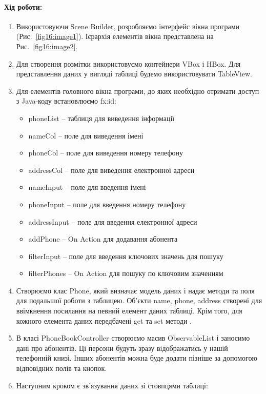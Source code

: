 \paragraph{Хід роботи:}
\begin{enumerate}
	
	\item Використовуючи Scene Builder, розробляємо інтерфейс вікна програми (Рис.~\ref{fig16:image1}). Ієрархія елементів вікна представлена на Рис.~\ref{fig16:image2}.
	\item Для створення розмітки використовуємо контейнери VBox і HBox. Для представлення даних у вигляді таблиці будемо використовувати TableView.
	\item Для елементів головного вікна програми, до яких необхідно отримати доступ з Java-коду встановлюємо fx:id:
	\begin{itemize}
		\item phoneList – таблиця для виведення інформації
		\item nameCol – поле для виведення імені
		\item phoneCol – поле для виведення номеру телефону
		\item addressCol – поле для виведення електронної адреси
		\item nameInput – поле для введення імені
		\item phoneInput – поле для введення номеру телефону
		\item addressInput – поле для введення електронної адреси
		\item addPhone – On Action для додавання абонента
		\item filterInput – поле для введення ключових значень для пошуку
		\item filterPhones – On Action для пошуку по ключовим значенням
	\end{itemize}
	\item Створюємо клас Phone, який визначає модель даних і надає методи та поля для подальшої роботи з таблицею.
		Об’єкти name, phone, address створені для ввімкнення посилання на певний елемент даних таблиці. Крім того, для кожного елемента даних передбачені get та set методи .
		\item В класі PhoneBookController створюємо масив ObservableList і заносимо дані про абонентів. Ці персони будуть зразу відображатись у нашій телефонній книзі. Інших абонентів можна буде додати пізніше за допомогою відповідних полів та кнопок.
		\item Наступним кроком є зв’язування даних зі стовпцями таблиці:

\end{enumerate}
